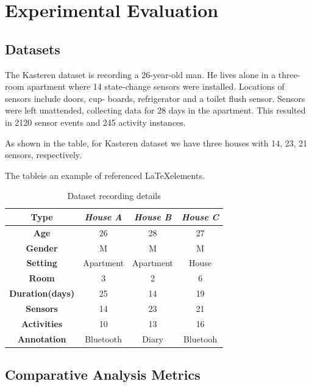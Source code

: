 

\section{Experimental Evaluation}

\subsection{Datasets}

The Kasteren dataset is recording a 26-year-old man. He lives alone in a three-room apartment where 14 state-change sensors were installed. Locations of sensors include doors, cup- boards, refrigerator and a toilet flush sensor. Sensors were left unattended, collecting data for 28 days in the apartment. This resulted in 2120 sensor events and 245 activity instances.

As shown in the table, for Kasteren dataset we have three houses with 14, 23, 21 sensors, respectively.

The tableis an example of referenced \LaTeX elements.
 
\begin{table}[t!]
\small
\begin{center}
\begin{tabular}{||c|c|c|c|||}
\hline
\textbf{Type} & \emph{House A} & \emph{House B} & \emph{House C}\\ \hline
\textbf{Age} & 26 & 28 & 27\\ \hline
\textbf{Gender} & M & M & M\\ \hline
\textbf{Setting} & Apartment & Apartment & House\\ \hline
\textbf{Room} & 3 & 2 & 6\\ \hline
\textbf{Duration(days)} & 25 & 14 & 19\\ \hline
\textbf{Sensors} & 14 & 23 & 21\\ \hline
\textbf{Activities} & 10 & 13 & 16\\ \hline
\textbf{Annotation} & Bluetooth & Diary & Bluetooh\\ \hline
\end{tabular}
\end{center}
\caption{Dataset recording details}
\label{table:fake-attacks}
\vspace{-0.3cm}
\end{table}




\subsection{Comparative Analysis Metrics}

